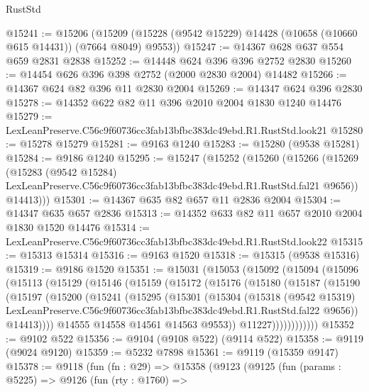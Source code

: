 \begin{lexlean}{RustStd}
\begin{coremodule}
@15241 := @15206
    (@15209 (@15228 (@9542 @15229) @14428 (@10658 (@10660 @615 @14431)) (@7664 @8049) @9553))
@15247 := @14367 @628 @637 @554 @659 @2831 @2838
@15252 := @14448 @624 @396 @396 @2752 @2830
@15260 := @14454 @626 @396 @398 @2752 (@2000 @2830 @2004) @14482
@15266 := @14367 @624 @82 @396 @11 @2830 @2004
@15269 := @14347 @624 @396 @2830
@15278 := @14352 @622 @82 @11 @396 @2010 @2004 @1830 @1240 @14476
@15279 := LexLeanPreserve.C56c9f60736cc3fab13bfbc383dc49ebd.R1.RustStd.look21
@15280 := @15278 @15279
@15281 := @9163 @1240
@15283 := @15280 (@9538 @15281)
@15284 := @9186 @1240
@15295 := @15247
    (@15252
      (@15260
        (@15266
          (@15269
            (@15283
              (@9542 @15284)
              LexLeanPreserve.C56c9f60736cc3fab13bfbc383dc49ebd.R1.RustStd.fal21
              @9656))
          @14413)))
@15301 := @14367 @635 @82 @657 @11 @2836 @2004
@15304 := @14347 @635 @657 @2836
@15313 := @14352 @633 @82 @11 @657 @2010 @2004 @1830 @1520 @14476
@15314 := LexLeanPreserve.C56c9f60736cc3fab13bfbc383dc49ebd.R1.RustStd.look22
@15315 := @15313 @15314
@15316 := @9163 @1520
@15318 := @15315 (@9538 @15316)
@15319 := @9186 @1520
@15351 := @15031
    (@15053
      (@15092
        (@15094
          (@15096
            (@15113
              (@15129
                (@15146
                  (@15159
                    (@15172
                      (@15176
                        (@15180
                          (@15187
                            (@15190
                              (@15197
                                (@15200
                                  (@15241
                                    (@15295
                                      (@15301
                                        (@15304
                                          (@15318
                                            (@9542 @15319)
                                            LexLeanPreserve.C56c9f60736cc3fab13bfbc383dc49ebd.R1.RustStd.fal22
                                            @9656))
                                        @14413))))
                                @14555
                                @14558
                                @14561
                                @14563
                                @9553))
                            @11227))))))))))))
@15352 := @9102 @522
@15356 := @9104 (@9108 @522) (@9114 @522)
@15358 := @9119 (@9024 @9120)
@15359 := @5232 @7898
@15361 := @9119 (@15359 @9147)
@15378 := @9118
    (fun (fn : @29) =>
    @15358
      (@9123
        (@9125
          (fun (params : @5225) =>
          @9126
            (fun (rty : @1760) =>

\end{coremodule}
\end{lexlean}

